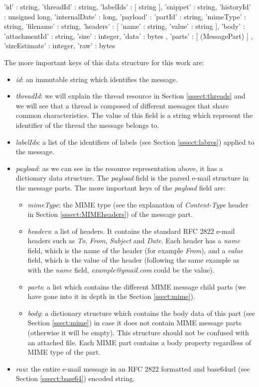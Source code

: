 \begin{python}
	{
		'id' : string,
		'threadId' : string,
		'labelIds' : [ string ],
		'snippet' : string,
		'historyId' : unsigned long,
		'internalDate' : long,
		'payload' : {
			'partId' : string,
			'mimeType' : string,
			'filename' : string,
			'headers' : [
			{
				'name' : string,
				'value' : string
			}
			],
			'body' : {
				'attachmentId' : string,
				'size' : integer,
				'data' : bytes
			},
			'parts' : [ (MessagePart) ]
		},
		'sizeEstimate' : integer,
		'raw' : bytes
	}
\end{python}

The more important keys of this data structure for this work are:
\begin{itemize}
	\item\textit{id}: an immutable string which identifies the message.
	\item\textit{threadId}: we will explain the thread resource in Section \ref{sssect:threads} and we will see that a thread is composed of different messages that share common characteristics. The value of this field is a string which represent the identifier of the thread the message belongs to.
	\item\textit{labelIds}: a list of the identifiers of labels (see Section \ref{sssect:labres}) applied to the message.
	\item\textit{payload}: as we can see in the resource representation above, it has a dictionary data structure. The \textit{payload} field is the parsed e-mail structure in the message parts. The more important keys of the \textit{payload} field are:
	\begin{itemize}
		\item\textit{mimeType}: the MIME type (see the explanation of \textit{Content-Type} header in Section \ref{sssect:MIMEheaders}) of the message part.
		\item\textit{headers}: a list of headers. It contains the standard RFC 2822 \citep{rfc2822} e-mail headers such as \textit{To}, \textit{From}, \textit{Subject} and \textit{Date}. Each header has a \textit{name} field, which is the name of the header (for example \textit{From}), and a \textit{value} field, which is the value of the header (following the same example as with the \textit{name} field, \textit{example@gmail.com} could be the value).
		\item\textit{parts}: a list which contains the different MIME message child parts (we have gone into it in depth in the Section \ref{ssect:mime}).
		\item\textit{body}: a dictionary structure which contains the body data of this part (see Section \ref{ssect:mime}) in case it does not contain MIME message parts (otherwise it will be empty). This structure should not be confused with an attached file. Each MIME part contains a body property regardless of MIME type of the part.
	\end{itemize}
	\item\textit{raw}: the entire e-mail message in an RFC 2822 \citep{rfc2822} formatted and base64url (see Section \ref{sssect:base64}) encoded string.
\end{itemize}

